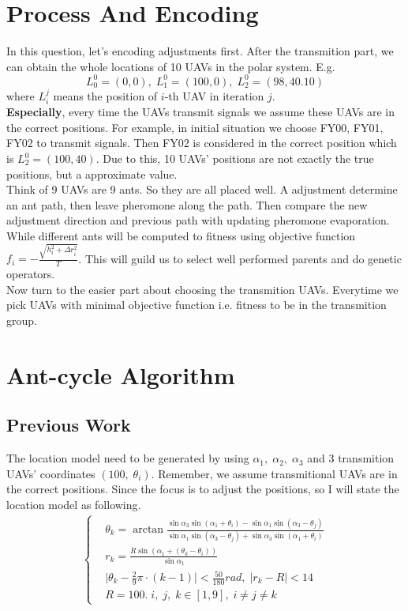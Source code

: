 \documentclass[lang=cn,a4paper,newtx]{elegantpaper}
\begin{document}
\section{Process And Encoding}
In this question, let's encoding adjustments first.
After the transmition part, we can obtain the whole locations of 10 UAVs in the polar system.
E.g. \[L_0^0=(0,0),\; L_1^0=(100,0),\; L_2^0=(98,40.10)\] where $L_i^j$ means the position of $i$-th UAV in iteration $j$.
\\ \textbf{Especially}, every time the UAVs transmit signals we assume these UAVs are in the correct positions.
For example, in initial situation we choose FY00, FY01, FY02 to transmit signals.
Then FY02 is considered in the correct position which is $L_2^0 = (100,40)$.
Due to this, 10 UAVs' positions are not exactly the true positions, but a approximate value.
\\Think of 9 UAVs are 9 ants. So they are all placed well.
A adjustment determine an ant path, then leave pheromone along the path.
Then compare the new adjustment direction and previous path with updating pheromone evaporation.
While different ants will be computed to fitness using objective function $f_i =-\frac{\sqrt{ h_i^2 + \Delta r_i^2}}{T} $.
This will guild us to select well performed parents and do genetic operators.
\\Now turn to the easier part about choosing the transmition UAVs.
Everytime we pick UAVs with minimal objective function i.e. fitness to be in the transmition group.

\section{Ant-cycle Algorithm}
\subsection{Previous Work}
The location model need to be generated by using $\alpha_1,\; \alpha_2,\; \alpha_3$ and 3 transmition UAVs' coordinates
$(100,\; \theta_i)$.
Remember, we assume transmitional UAVs are in the correct positions.
Since the focus is to adjust the positions, so I will state the location model as following.
\begin{align}
\left\{ 
    \begin{aligned}
    &\theta_k = \arctan \frac{\sin\alpha_3 \sin(\alpha_1 + \theta_i)-\sin\alpha_1 \sin(\alpha_3 -\theta_j)}{\sin\alpha_1 \sin(\alpha_3 - \theta_j)+\sin\alpha_3 \sin(\alpha_1 +\theta_i)}\\
    &r_k = \frac{R\sin(\alpha_1+(\theta_k - \theta_i))}{\sin\alpha_1}\\
    &\lvert \theta_k -\frac{2}{9}\pi \cdot(k-1) \rvert <\frac{50}{180}rad,\; \lvert r_k -R \rvert < 14\\
    &R=100.\; i,\; j,\; k\in[1,9],\;i\neq j\neq k
    \end{aligned} 
\right.
\end{align} 
\end{document}
